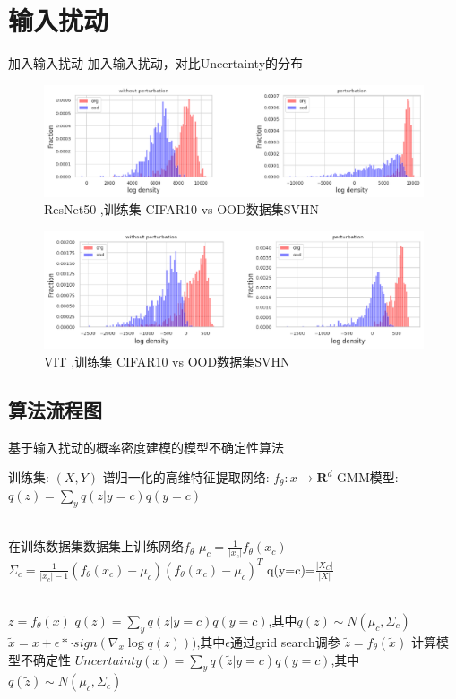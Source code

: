 \section{输入扰动}
加入输入扰动
加入输入扰动，对比Uncertainty的分布
\begin{figure}[H]
    \centering
    \includegraphics[width=0.75\linewidth]{assets/3-3.png}
    \caption{ResNet50 ,训练集 CIFAR10 vs OOD数据集SVHN}
    \label{fig:enter-label}
\end{figure}
\begin{figure}[H]
    \centering
    \includegraphics[width=0.75\linewidth]{assets/3-4.png}
    \caption{VIT ,训练集 CIFAR10 vs OOD数据集SVHN}
    \label{fig:enter-label}
\end{figure}

\subsection{算法流程图}
\begin{algorithm}[H]
	\caption{基于输入扰动的概率密度建模的模型不确定性算法}
	\label{alg:1}
	
	\begin{algorithmic}[1]
		\Require 训练集: $(X,Y)$ 
		\Require 谱归一化的高维特征提取网络: $f_{\theta}:x \rightarrow \mathbf{R}^d $ 
		\Require GMM模型: $q(z) = \sum_{y}q(z|y=c)q(y=c)$
		
		\\
		\State 在训练数据集数据集上训练网络$f_{\theta}$
		\State $\mu_{c}=\frac{1}{|x_c|}f_{\theta}(x_c)$
		\State $\Sigma_c = \frac{1}{|x_c|-1}(f_{\theta}(x_c)-\mu_c)(f_{\theta}(x_c)-\mu_c)^T$
		\State q(y=c)=$\frac{|X_C|}{|X|}$
		\EndFor
		\EndProcedure

		
		\\
		\State $z=f_{\theta}(x)$
		\State  $q(z) = \sum_{y}q(z|y=c)q(y=c)$,其中$q(z)\sim N(\mu_c,\Sigma_c)$
		\State $\tilde{x}=x+\epsilon* \cdot sign(\nabla_x \log q(z)))$,其中$\epsilon$通过grid search调参
		\State $\tilde{z}=f_{\theta}(\tilde{x})$
		\State 计算模型不确定性 $Uncertainty(x) = \sum_{y}q(\tilde{z}|y=c)q(y=c)$,其中$q(\tilde{z})\sim N(\mu_c,\Sigma_c)$
		\EndProcedure
	\end{algorithmic}
\end{algorithm}



